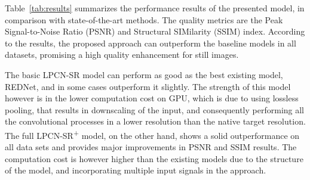 \documentclass[10pt,twocolumn,letterpaper]{article}
\begin{document}
Table~\ref{tab:results} summarizes the performance results of the presented model, in comparison with
state-of-the-art methods. The quality metrics are the Peak Signal-to-Noise Ratio (PSNR) and Structural 
SIMilarity (SSIM) index. According to the results, the proposed approach can outperform the baseline models
in all datasets, promising a high quality enhancement for still images.

The basic LPCN-SR model can perform as good as the best existing model, REDNet, and in some cases outperform
it slightly. The strength of this model however is in the lower computation cost on GPU, which is due to using
lossless pooling, that results in downscaling of the input, and consequently performing all the convolutional
processes in a lower resolution than the native target resolution. The full LPCN-SR\textsuperscript{+} model,
on the other hand, shows a solid outperformance on all data sets and provides major improvements in PSNR and
SSIM results. The computation cost is however higher than the existing models due to the structure of the model, 
and incorporating multiple input signals in the approach.
\end{document}
